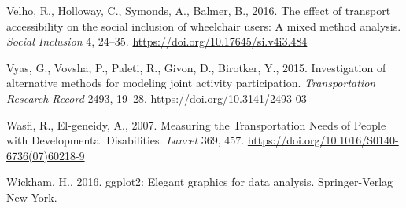 \documentclass[3p, authoryear, review]{elsarticle} %
\newlength{\cslhangindent}
\newenvironment{CSLReferences}[2] %
 {%
  \setlength{\parindent}{0pt}
  \ifodd #1 \everypar{\setlength{\hangindent}{\cslhangindent}}\ignorespaces\fi
  \ifnum #2 > 0
  \setlength{\parskip}{#2\baselineskip}
  \fi
 }%
 {}
\begin{document}
\begin{CSLReferences}{1}{0}
\leavevmode{}%
Velho, R., Holloway, C., Symonds, A., Balmer, B., 2016. {The effect of transport accessibility on the social inclusion of wheelchair users: A mixed method analysis}. \emph{Social Inclusion} 4, 24--35. \url{https://doi.org/10.17645/si.v4i3.484}

\leavevmode{}%
Vyas, G., Vovsha, P., Paleti, R., Givon, D., Birotker, Y., 2015. Investigation of alternative methods for modeling joint activity participation. \emph{Transportation Research Record} 2493, 19--28. \url{https://doi.org/10.3141/2493-03}

\leavevmode{}%
Wasfi, R., El-geneidy, A., 2007. {Measuring the Transportation Needs of People with Developmental Disabilities}. \emph{Lancet} 369, 457. \url{https://doi.org/10.1016/S0140-6736(07)60218-9}

\leavevmode{}%
Wickham, H., 2016. ggplot2: Elegant graphics for data analysis. Springer-Verlag New York.

\end{CSLReferences}
\end{document}
